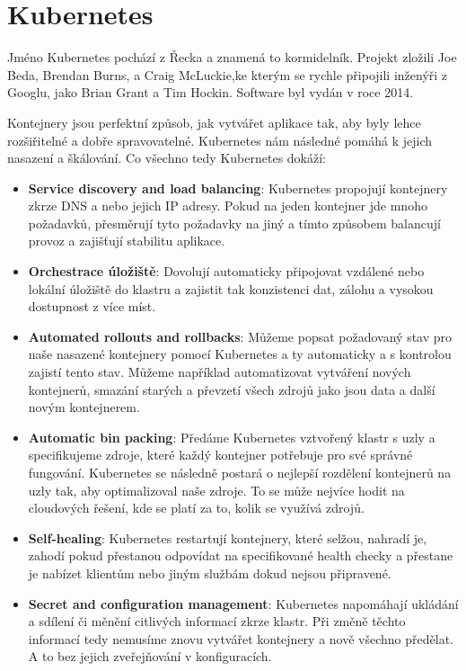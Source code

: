
\section{Kubernetes}

Jméno Kubernetes pochází z Řecka a znamená to kormidelník. Projekt zložili Joe Beda, Brendan Burns, a Craig McLuckie,ke kterým se rychle připojili inženýři z Googlu, jako Brian Grant a Tim Hockin. Software byl vydán v roce 2014.

Kontejnery jsou perfektní způsob, jak vytvářet aplikace tak, aby byly lehce rozšiřitelné a dobře spravovatelné. Kubernetes nám následné pomáhá k jejich nasazení a škálování. Co všechno tedy Kubernetes dokáží:


\begin{itemize}
  	\item \textbf{Service discovery and load balancing}: Kubernetes propojují kontejnery zkrze DNS a nebo jejich IP adresy. Pokud na jeden 	kontejner jde mnoho požadavků, přesměrují tyto požadavky na jiný a tímto způsobem balancují provoz a zajišťují stabilitu aplikace.
	\item \textbf{Orchestrace úložiště}: Dovolují automaticky připojovat vzdálené nebo lokální úložiště do klastru a zajistit tak konzistenci dat, zálohu a vysokou dostupnost z více míst.
  	\item \textbf{Automated rollouts and rollbacks}: Můžeme popsat požadovaný stav pro naše nasazené kontejnery pomocí Kubernetes a ty automaticky a s kontrolou zajistí tento stav. Můžeme například automatizovat vytváření nových kontejnerů, smazání starých a převzetí všech zdrojů jako jsou data a další novým kontejnerem.
	\item \textbf{Automatic bin packing}: Předáme Kubernetes vztvořený klastr s uzly a specifikujeme zdroje, které každý kontejner potřebuje pro své správné fungování. Kubernetes se následně postará o nejlepší rozdělení kontejnerů na uzly tak, aby optimalizoval naše zdroje. To se může nejvíce hodit na cloudových řešení, kde se platí za to, kolik se využívá zdrojů. 
   	\item \textbf{Self-healing}:	Kubernetes restartují kontejnery, které selžou, nahradí je, zahodí pokud přestanou odpovídat na specifikované health checky a přestane je nabízet klientům nebo jiným službám dokud nejsou připravené. 
	\item \textbf{Secret and configuration management}: Kubernetes napomáhají ukládání a sdílení či měnění citlivých informací zkrze klastr. Při změně těchto informací tedy nemusíme znovu vytvářet kontejnery a nově všechno předělat. A to bez jejich zveřejňování v konfiguracích. 

\end{itemize}

